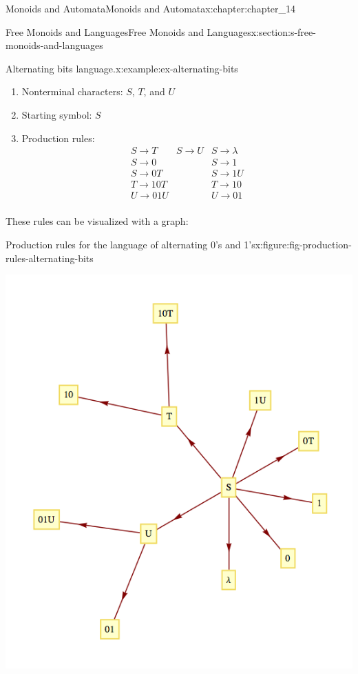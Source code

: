 \documentclass[twoside,10pt,]{book}
\numberwithin{equation}{section}
\begin{document}
\begin{chapterptx}{Monoids and Automata}{}{Monoids and Automata}{}{}{x:chapter:chapter_14}
\begin{sectionptx}{Free Monoids and Languages}{}{Free Monoids and Languages}{}{}{x:section:s-free-monoids-and-languages}
\begin{example}{Alternating bits language.}{x:example:ex-alternating-bits}
\begin{enumerate}[label=(\arabic*)]
\item{}Nonterminal characters: \(S\), \(T\), and \(U\)%
\item{}Starting symbol: \(S\)%
\item{}Production rules:%
\begin{equation*}
\begin{array}{ccc}
S\to T & S\to U & S\to \lambda\\
S\to 0& & S\to 1\\
S\to 0T&& S\to 1U \\
T\to 10T&& T\to 10\\
U\to 01U& & U\to 01\\
\end{array}
\end{equation*}
%
\end{enumerate}
%
\par
These rules can be visualized with a graph:%
\begin{figureptx}{Production rules for the language of alternating 0's and 1's}{x:figure:fig-production-rules-alternating-bits}{}%
\begin{image}{0.15}{0.7}{0.15}%
\includegraphics[width=\linewidth]{images/fig-production-rules-alternating-bits.png}

\end{image}
\end{figureptx}
\end{example}
\end{sectionptx}
\end{chapterptx}
\end{document}
